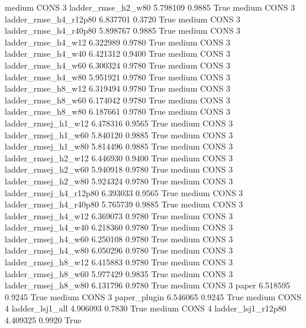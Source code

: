     medium     CONS                 3     ladder_rmse_h2_w80   5.798109      0.9885    True
    medium     CONS                 3  ladder_rmse_h4_r12p80   6.837701      0.3720    True
    medium     CONS                 3  ladder_rmse_h4_r40p80   5.898767      0.9885    True
    medium     CONS                 3     ladder_rmse_h4_w12   6.322989      0.9780    True
    medium     CONS                 3     ladder_rmse_h4_w40   6.421312      0.9400    True
    medium     CONS                 3     ladder_rmse_h4_w60   6.300324      0.9780    True
    medium     CONS                 3     ladder_rmse_h4_w80   5.951921      0.9780    True
    medium     CONS                 3     ladder_rmse_h8_w12   6.319494      0.9780    True
    medium     CONS                 3     ladder_rmse_h8_w60   6.174042      0.9780    True
    medium     CONS                 3     ladder_rmse_h8_w80   6.187661      0.9780    True
    medium     CONS                 3    ladder_rmsej_h1_w12   6.478316      0.9565    True
    medium     CONS                 3    ladder_rmsej_h1_w60   5.840120      0.9885    True
    medium     CONS                 3    ladder_rmsej_h1_w80   5.814496      0.9885    True
    medium     CONS                 3    ladder_rmsej_h2_w12   6.446930      0.9400    True
    medium     CONS                 3    ladder_rmsej_h2_w60   5.940918      0.9780    True
    medium     CONS                 3    ladder_rmsej_h2_w80   5.924324      0.9780    True
    medium     CONS                 3 ladder_rmsej_h4_r12p80   6.393033      0.9565    True
    medium     CONS                 3 ladder_rmsej_h4_r40p80   5.765739      0.9885    True
    medium     CONS                 3    ladder_rmsej_h4_w12   6.369073      0.9780    True
    medium     CONS                 3    ladder_rmsej_h4_w40   6.218360      0.9780    True
    medium     CONS                 3    ladder_rmsej_h4_w60   6.250108      0.9780    True
    medium     CONS                 3    ladder_rmsej_h4_w80   6.050296      0.9780    True
    medium     CONS                 3    ladder_rmsej_h8_w12   6.415883      0.9780    True
    medium     CONS                 3    ladder_rmsej_h8_w60   5.977429      0.9835    True
    medium     CONS                 3    ladder_rmsej_h8_w80   6.131796      0.9780    True
    medium     CONS                 3                  paper   6.518595      0.9245    True
    medium     CONS                 3           paper_plugin   6.546065      0.9245    True
    medium     CONS                 4        ladder_lsj1_all   4.906093      0.7830    True
    medium     CONS                 4     ladder_lsj1_r12p80   4.409325      0.9920    True
